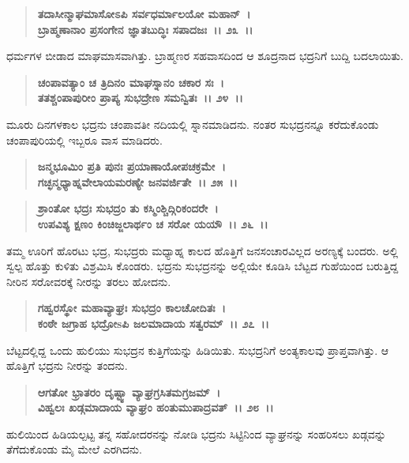 \begin{verse}
\textbf{ತದಾಸೀನ್ಮಾಘಮಾಸೋಽಪಿ ಸರ್ವಧರ್ಮಾಲಯೋ ಮಹಾನ್~।}\\\textbf{ಬ್ರಾಹ್ಮಣಾನಾಂ ಪ್ರಸಂಗೇನ ಜ್ಞಾತಬುದ್ಧಿಃ ಸಪಾದಜಃ~।। ೨೩~।।}
\end{verse}

ಧರ್ಮಗಳ ಬೀಡಾದ ಮಾಘಮಾಸವಾಗಿತ್ತು. ಬ್ರಾಹ್ಮಣರ ಸಹವಾಸದಿಂದ ಆ ಶೂದ್ರನಾದ ಭದ್ರನಿಗೆ ಬುದ್ದಿ ಬದಲಾಯಿತು.

\begin{verse}
\textbf{ಚಂಪಾವತ್ಯಾಂ ಚ ತ್ರಿದಿನಂ ಮಾಘಸ್ನಾನಂ ಚಕಾರ ಸಃ~।}\\\textbf{ತತಶ್ಚಂಪಾಪುರೀಂ ಪ್ರಾಪ್ಯ ಸುಭದ್ರೇಣ ಸಮನ್ವಿತಃ~।। ೨೪~।।}
\end{verse}

ಮೂರು ದಿನಗಳಕಾಲ ಭದ್ರನು ಚಂಪಾವತೀ ನದಿಯಲ್ಲಿ ಸ್ನಾನಮಾಡಿದನು. ನಂತರ ಸುಭದ್ರನನ್ನೂ ಕರೆದುಕೊಂಡು ಚಂಪಾಪುರಿಯಲ್ಲಿ ಇಬ್ಬರೂ ವಾಸ ಮಾಡಿದರು.

\begin{verse}
\textbf{ಜನ್ಮಭೂಮಿಂ ಪ್ರತಿ ಪುನಃ ಪ್ರಯಾಣಾಯೋಪಚಕ್ರಮೇ~।}\\\textbf{ಗಚ್ಛನ್ಮಧ್ಯಾಹ್ನವೇಲಾಯಮರಣ್ಯೇ ಜನವರ್ಜಿತೇ~।। ೨೫~।। }
\end{verse}

\begin{verse}
\textbf{ಶ್ರಾಂತೋ ಭದ್ರಃ ಸುಭದ್ರಂ ತು ಕಸ್ಮಿಂಶ್ಚಿದ್ಗಿರಿಕಂದರೇ~।}\\\textbf{ಉಪವಿಶ್ಯ ಕ್ಷಣಂ ಕಿಂಚಿಜ್ಜಲಾರ್ಥಂ ಚ ಸರೋ ಯಯೌ~।। ೨೬~।।}
\end{verse}

ತಮ್ಮ ಊರಿಗೆ ಹೊರಟು ಭದ್ರ, ಸುಭದ್ರರು ಮಧ್ಯಾಹ್ನ ಕಾಲದ ಹೊತ್ತಿಗೆ ಜನಸಂಚಾರವಿಲ್ಲದ ಅರಣ್ಯಕ್ಕೆ ಬಂದರು. ಅಲ್ಲಿ ಸ್ವಲ್ಪ ಹೊತ್ತು ಕುಳಿತು ವಿಶ್ರಮಿಸಿ ಕೊಂಡರು. ಭದ್ರನು ಸುಭದ್ರನನ್ನು ಅಲ್ಲಿಯೇ ಕೂಡಿಸಿ ಬೆಟ್ಟದ ಗುಹೆಯಿಂದ ಬರುತ್ತಿದ್ದ ನೀರಿನ ಸರೋವರಕ್ಕೆ ನೀರನ್ನು ತರಲು ಹೋದನು.

\begin{verse}
\textbf{ಗಹ್ವರಸ್ಥೋ ಮಹಾವ್ಯಾಘ್ರಃ ಸುಭದ್ರಂ ಕಾಲಚೋದಿತಃ~।}\\\textbf{ಕಂಠೇ ಜಗ್ರಾಹ ಭದ್ರೋsಪಿ ಜಲಮಾದಾಯ ಸತ್ವರಮ್~।। ೨೭~।।}
\end{verse}

ಬೆಟ್ಟದಲ್ಲಿದ್ದ ಒಂದು ಹುಲಿಯು ಸುಭದ್ರನ ಕುತ್ತಿಗೆಯನ್ನು ಹಿಡಿಯಿತು. ಸುಭದ್ರನಿಗೆ ಅಂತ್ಯಕಾಲವು ಪ್ರಾಪ್ತವಾಗಿತ್ತು. ಆ ಹೊತ್ತಿಗೆ ಭದ್ರನು ನೀರನ್ನು ತಂದನು.

\begin{verse}
\textbf{ಆಗತೋ ಭ್ರಾತರಂ ದೃಷ್ಟ್ವಾ ವ್ಯಾಘ್ರಗ್ರಸಿತಮಗ್ರಜಮ್~।}\\\textbf{ವಿಹ್ವಲಃ ಖಡ್ಗಮಾದಾಯ ವ್ಯಾಘ್ರಂ ಹಂತುಮುಪಾದ್ರವತ್~।। ೨೮~।।}
\end{verse}

ಹುಲಿಯಿಂದ ಹಿಡಿಯಲ್ಪಟ್ಟ ತನ್ನ ಸಹೋದರನನ್ನು ನೋಡಿ ಭದ್ರನು ಸಿಟ್ಟಿನಿಂದ ವ್ಯಾಘ್ರನನ್ನು ಸಂಹರಿಸಲು ಖಡ್ಗವನ್ನು ತೆಗೆದುಕೊಂಡು ಮೈ ಮೇಲೆ ಎರಗಿದನು.

